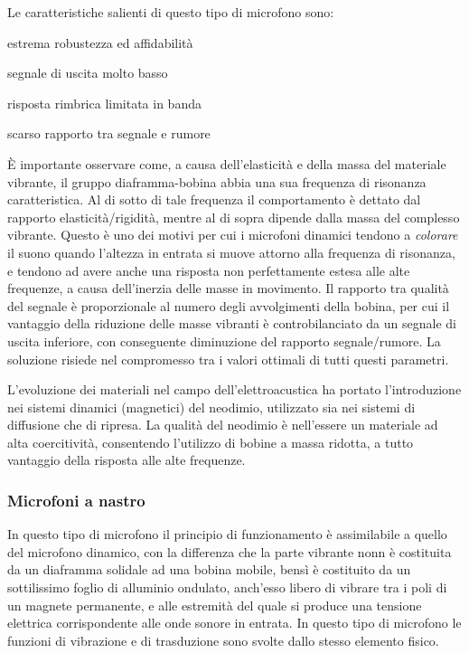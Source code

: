 \begin{refsection}
Le caratteristiche salienti di questo tipo di microfono sono:

\begin{compactitem}
  \item estrema robustezza ed affidabilità
  \item segnale di uscita molto basso
  \item risposta rimbrica limitata in banda
  \item scarso rapporto tra segnale e rumore
\end{compactitem}

È importante osservare come, a causa dell’elasticità e della massa del materiale
vibrante, il gruppo diaframma-bobina abbia una sua frequenza di risonanza
caratteristica. Al di sotto di tale frequenza il comportamento è dettato dal
rapporto elasticità/rigidità, mentre al di sopra dipende dalla massa del
complesso vibrante. Questo è uno dei motivi per cui i microfoni dinamici
tendono a \emph{colorare} il suono quando l'altezza in entrata si muove attorno
alla frequenza di risonanza, e tendono ad avere anche una risposta non perfettamente
estesa alle alte frequenze, a causa dell’inerzia delle masse in movimento.
Il rapporto tra qualità del segnale è proporzionale al numero degli avvolgimenti
della bobina, per cui il vantaggio della riduzione delle masse vibranti è
controbilanciato da un segnale di uscita inferiore, con conseguente diminuzione
del rapporto segnale/rumore. La soluzione risiede nel compromesso tra i valori
ottimali di tutti questi parametri.

L'evoluzione dei materiali nel campo dell'elettroacustica ha portato l'introduzione
nei sistemi dinamici (magnetici) del neodimio, utilizzato sia nei sistemi di
diffusione che di ripresa. La qualità del neodimio è nell'essere un materiale ad
alta coercitività, consentendo l’utilizzo di bobine a massa ridotta, a tutto
vantaggio della risposta alle alte frequenze.

\subsubsection{Microfoni a nastro}

In questo tipo di microfono il principio di funzionamento è assimilabile a
quello del microfono dinamico, con la differenza che la parte vibrante nonn è
costituita da un diaframma solidale ad una bobina mobile, bensì è costituito
da un sottilissimo foglio di alluminio
ondulato, anch’esso libero di vibrare tra i poli di un magnete permanente, e
alle estremità del quale si produce una tensione elettrica corrispondente alle
onde sonore in entrata. In questo tipo di microfono le funzioni
di vibrazione e di trasduzione sono svolte dallo stesso elemento fisico.


\end{refsection}
